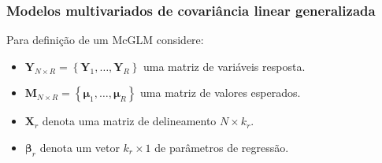 \documentclass[10pt,
  aspectratio=169,
  serif,
  mathserif,
  professionalfont,
  compress,
  handout,
  ]{beamer}\usepackage[]{graphicx}\usepackage[]{color}
\begin{document}

\begin{frame}
\frametitle{Modelos multivariados de covariância linear generalizada}

Para definição de um McGLM considere:

\begin{itemize}
  
  \itemsep 2ex
  
  \item $\boldsymbol{Y}_{N \times R} = \left \{ \boldsymbol{Y}_1, \dots, \boldsymbol{Y}_R \right \}$ uma  matriz de variáveis resposta.
  
  \item $\boldsymbol{M}_{N \times R} = \left \{ \boldsymbol{\mu}_1, \dots, \boldsymbol{\mu}_R \right \}$ uma matriz de valores esperados.
  
    \item $\boldsymbol{X}_r$ denota uma matriz de delineamento $N \times k_r$.
  
  \item $\boldsymbol{\beta}_r$ denota um vetor $k_r \times 1$ de parâmetros de regressão.
  
\end{itemize}

\end{frame}

\end{document}
